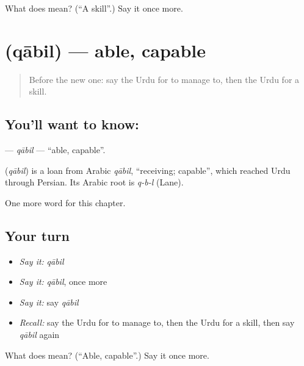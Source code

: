 \begin{tcolorbox}[breakable,colback=teal!4,colframe=teal!35!black,title={Before you move on}]
What does  mean? (\textquotedblleft{}A skill\textquotedblright{}.) Say it once more.
\end{tcolorbox}
\section[\texorpdfstring{\ur{قابل} (qābil)}{قابل (qābil)}]{ (qābil) — able, capable}

\label{lesson:UR-C104-qabil}



\begin{quote}
Before the new one: say the Urdu for to manage to, then the Urdu for a skill.
\end{quote}

\subsection*{You'll want to know: }
\textbf{} — \emph{qābil} — \textquotedblleft{}able, capable\textquotedblright{}.

\begin{cousinweb}
\textbf{} (\emph{qābil}) is a loan from Arabic \emph{qābil}, \textquotedblleft{}receiving; capable\textquotedblright{}, which reached Urdu through Persian. Its Arabic root is \emph{q-b-l} (Lane).
\end{cousinweb}

\begin{grammarlens}[title={What you've built}]
One more word for this chapter.
\end{grammarlens}

\subsection*{Your turn}
\begin{itemize}
\raggedright
  \item \emph{Say it:} \emph{qābil}
  \item \emph{Say it:} \emph{qābil}, once more
  \item \emph{Say it:} say \emph{qābil}
  \item \emph{Recall:} say the Urdu for to manage to, then the Urdu for a skill, then say \emph{qābil} again
\end{itemize}

\begin{tcolorbox}[breakable,colback=teal!4,colframe=teal!35!black,title={Before you move on}]
What does  mean? (\textquotedblleft{}Able, capable\textquotedblright{}.) Say it once more.
\end{tcolorbox}
